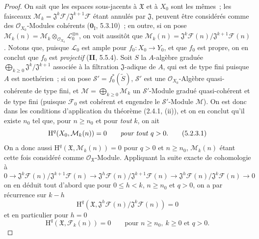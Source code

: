 \begin{proof}
On sait que les espaces sous-jacents à $\mathfrak X$ et à $X_0$ sont les mêmes~;
les faisceaux
$\mathcal M_k=\mathfrak J^k\mathcal F/\mathfrak J^{k+1}\mathcal F$
étant annulés par $\mathfrak J$, peuvent être considérés comme des
$\mathcal O_{X_0}$-Modules cohérents ($\mathbf{0}_{\mathrm I}$, 5.3.10)~; en outre, si on
pose $\mathcal M_k(n)=\mathcal M_k\otimes_{\mathcal O_{X_0}}
\mathcal L_0^{\otimes n}$, on voit aussitôt que
$\mathcal M_k(n)=\mathfrak J^k\mathcal F(n)/
\mathfrak J^{k+1}\mathcal F(n)$.
Notons que, puisque $\mathcal L_0$ est ample pour $f_0:X_0\to Y_0$, et
que $f_0$ est propre, on en conclut que $f_0$ est \emph{projectif} (\textbf{II}, 5.5.4). Soit $S$ la $A$-algèbre
graduée $\bigoplus_{k\geq0}\mathfrak J^k/\mathfrak J^{k+1}$ associée à la filtration $\mathfrak J$-adique de $A$, qui est
de type fini puisque $A$ est noethérien~; si on pose
$\mathcal S'=f_0^*(\widetilde S)$,
$\mathcal S'$ est une
$\mathcal O_{X_0}$-Algèbre quasi-cohérente de type fini, et
$\mathcal M=\bigoplus_{k\geq0}\mathcal M_k$ un
$\mathcal S'$-Module gradué quasi-cohérent et de type fini (puisque $\mathcal F_0$
est cohérent et engendre le $\mathcal S'$-Module $\mathcal M$). On est donc dans les
conditions d'application du théorème (2.4.1, (ii)), et on en conclut qu'il existe
$n_0$ tel que, pour $n\geq n_0$ et pour \emph{tout} $k$, on ait
\begin{equation}
\mathrm H^q(X_0,\mathcal M_k(n))=0\qquad\text{\emph{pour tout} }q>0.
\tag{5.2.3.1}
\label{III.5.2.3.1-fr}
\end{equation}
On a donc aussi $\mathrm H^q(\mathfrak X,\mathcal M_k(n))=0$ pour $q>0$ et
$n\geq n_0$, $\mathcal M_k(n)$ étant cette fois considéré comme
$\mathcal O_{\mathfrak X}$-Module. Appliquant la suite exacte de cohomologie à
\[
0\to
\mathfrak J^k\mathcal F(n)/\mathfrak J^{k+1}\mathcal F(n)
\to
\mathfrak J^h\mathcal F(n)/\mathfrak J^{k+1}\mathcal F(n)
\to
\mathfrak J^h\mathcal F(n)/\mathfrak J^k\mathcal F(n)
\to0
\]
on en déduit tout d'abord que pour $0\leq h<k$, $n\geq n_0$ et $q>0$, on a par
récurrence sur $k-h$
\begin{equation}
\mathrm H^q(\mathfrak X,
\mathfrak J^h\mathcal F(n)/\mathfrak J^k\mathcal F(n))=0
\tag{5.2.3.2}
\label{III.5.2.3.2-fr}
\end{equation}
et en particulier pour $h=0$
\begin{equation}
\mathrm H^q(\mathfrak X,\mathcal F_k(n))=0
\qquad\text{pour }n\geq n_0,\ k\geq0\text{ et }q>0.
\tag{5.2.3.3}
\label{III.5.2.3.3-fr}
\end{equation}

\end{proof}
